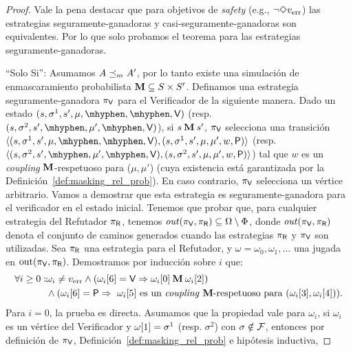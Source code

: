 \begin{proof} 
 Vale la pena destacar que para objetivos de \textit{safety} (e.g., $\neg \Diamond \ErrorSt$) las estrategias seguramente-ganadoras y casi-seguramente-ganadoras son equivalentes. Por lo que solo probamos el teorema para las estrategias seguramente-ganadoras.
  
\noindent ``Solo Si'': Asumamos $A \Masking A'$, por lo tanto existe una simulación de enmascaramiento probabilista $\M \subseteq S \times S'$.
Definamos una estrategia seguramente-ganadora  $\strat{\Verifier}$ para el Verificador de la siguiente manera.
Dado un estado $(s, \sigma^1, s', \mu, \mhyphen, \mhyphen, \Verifier)$ (resp. $(s, \sigma^2, s', \mhyphen, \mu', \mhyphen, \Verifier)$), si $s \M  s'$, $\strat{\Verifier}$ selecciona una transición
$\langle (s, \sigma^1, s', \mu, \mhyphen, \mhyphen, \Verifier), (s, \sigma^1, s', \mu, \mu', w, \Probabilistic)\rangle$ (resp. $\langle (s, \sigma^2, s', \mhyphen, \mu', \mhyphen, \Verifier),(s, \sigma^2, s', \mu, \mu', w, \Probabilistic)\rangle$) tal que $w$ es un \textit{coupling} $\M$-respetuoso para ($\mu,\mu'$) 
(cuya existencia está garantizada por la Definición~\ref{def:masking_rel_prob}). En caso contrario, $\strat{\Verifier}$ selecciona un vértice arbitrario. 
Vamos a demostrar que esta estrategia es seguramente-ganadora para el verificador en el estado inicial.
Tenemos que probar que, para cualquier estrategia del Refutador $\strat{\Refuter}$, tenemos $\out(\strat{\Verifier}, \strat{\Refuter}) \subseteq\Omega \setminus \Phi$, donde $\out(\strat{\Verifier}, \strat{\Refuter})$ denota el conjunto de caminos generados cuando las estrategias $\strat{\Refuter}$ y $\strat{\Verifier}$ son utilizadas.  Sea $\strat{\Refuter}$ una estrategia para el Refutador, y $\omega = \omega_0, \omega_1,  \dots$ una jugada en $\text{out}(\strat{\Verifier}, \strat{\Refuter})$. 
Demostramos por inducción sobre $i$ que:
\begin{align} 
\forall i \geq 0: & \omega_i \neq \ErrorSt \wedge (\pr{6}{\omega_i} = \Verifier \Rightarrow \pr{0}{\omega_i} \M  \pr{2}{\omega_i}) \nonumber \\ 
&\wedge (\pr{6}{\omega_i} = \Probabilistic \Rightarrow \text{ $\pr{5}{\omega_i}$ es un \textit{coupling} $\M$-respetuoso para $(\pr{3}{\omega_i},  \pr{4}{\omega_i})$}). \label{eq1:thm:wingame_strat_prob}
\end{align}
Para $i=0$, la prueba es directa. Asumamos que la propiedad vale para $\omega_i$, si $\omega_i$ es un vértice del Verificador y 
$\pr{1}{\omega} = \sigma^1$ (resp. $\sigma^2$) con $\sigma \notin \faults$, entonces por definición de $\strat{\Verifier}$, Definición~\ref{def:masking_rel_prob} e hipótesis inductiva, 

\end{proof}
